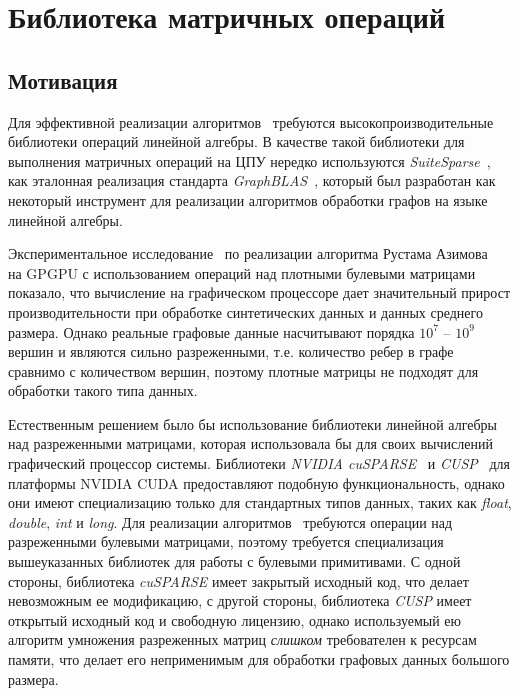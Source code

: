 \documentclass[14pt]{matmex-diploma-custom}
\begin{document}

\section{Библиотека матричных операций}
 
\subsection{Мотивация}

Для эффективной реализации алгоритмов~\cite{inbook:kronecker_cfpq_adbis, inproceedings:matrix_cfpq} требуются высокопроизводительные библиотеки операций линейной алгебры. В качестве такой библиотеки для выполнения матричных операций на ЦПУ нередко используются \textit{SuiteSparse}~\cite{net:suite_sparse},  как эталонная реализация стандарта \textit{GraphBLAS}~\cite{net:graphblas}, который был разработан как некоторый инструмент для реализации алгоритмов обработки графов на языке линейной алгебры.  

Экспериментальное исследование~\cite{inproceedings:cfpq_matrix_evaluation} по реализации алгоритма Рустама Азимова~\cite{inproceedings:matrix_cfpq} на GPGPU с использованием операций над плотными булевыми матрицами показало, что вычисление на графическом процессоре дает значительный прирост производительности при обработке синтетических данных и данных среднего размера. Однако реальные графовые данные насчитывают порядка $10^7$ -- $10^9$ вершин и являются сильно разреженными, т.е. количество ребер в графе сравнимо с количеством вершин, поэтому плотные матрицы не подходят для обработки такого типа данных. 

Естественным решением было бы использование библиотеки линейной алгебры над разреженными матрицами, которая использовала бы для своих вычислений графический процессор системы. Библиотеки \textit{NVIDIA cuSPARSE}~\cite{net:cusparse_docs} и \textit{CUSP}~\cite{net:cusplibrary} для платформы NVIDIA CUDA предоставляют подобную функциональность, однако они имеют специализацию только для стандартных типов данных, таких как \textit{float}, \textit{double}, \textit{int} и \textit{long}. Для реализации алгоритмов~\cite{inbook:kronecker_cfpq_adbis, inproceedings:matrix_cfpq} требуются операции над разреженными булевыми матрицами, поэтому требуется специализация вышеуказанных библиотек для работы с булевыми примитивами. С одной стороны, библиотека \textit{cuSPARSE} имеет закрытый исходный код, что делает невозможным ее модификацию, с другой стороны, библиотека \textit{CUSP} имеет открытый исходный код и свободную лицензию, однако используемый ею алгоритм умножения разреженных матриц \textit{слишком} требователен к ресурсам памяти, что делает его неприменимым для обработки графовых данных большого размера.
\end{document}
